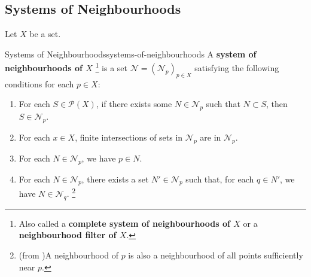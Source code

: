 \subsection{Systems of Neighbourhoods}\label{subsection-fundamental-neighbourhoods}
Let $X$ be a set.
\begin{definition}{Systems of Neighbourhoods}{systems-of-neighbourhoods}%
    A \textbf{system of neighbourhoods of $X$}%
    \footnote{%
        Also called a \textbf{complete system of neighbourhoods of $X$} or a \textbf{neighbourhood filter of $X$}.
            \par\vspace*{-1.75\baselineskip}
    } %
    is a set $\mathcal{N}=(\mathcal{N}_{p})_{p\in X}$ satisfying the following conditions for each $p\in X$:
    \begin{enumerate}
        \item\label{systems-of-neighbourhoods-1}For each $S\in\mathcal{P}(X)$, if there exists some $N\in\mathcal{N}_{p}$ such that $N\subset S$, then $S\in\mathcal{N}_{p}$.
        \item\label{systems-of-neighbourhoods-2}For each $x\in X$, finite intersections of sets in $\mathcal{N}_{p}$ are in $\mathcal{N}_{p}$.
        \item\label{systems-of-neighbourhoods-3}For each $N\in\mathcal{N}_{p}$, we have $p\in N$.
        \item\label{systems-of-neighbourhoods-4}For each $N\in\mathcal{N}_{p}$, there exists a set $N'\in\mathcal{N}_{p}$ such that, for each $q\in N'$, we have $N\in\mathcal{N}_{q}$.%
            \footnote{%
                (from \cite[p.~19]{bourbaki-general-topology-1-4})\SloganFont{: }A neighbourhood of $p$ is also a neighbourhood of all points sufficiently near $p$.
                \par\vspace*{-1.75\baselineskip}
            }%
    \end{enumerate}
\end{definition}
